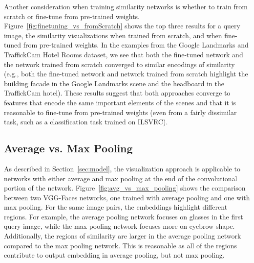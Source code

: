 Another consideration when training similarity networks is whether to train from scratch or fine-tune from pre-trained weights. Figure~\ref{fig:finetuning_vs_fromScratch} shows the top three results for a query image, the similarity visualizations when trained from scratch, and when fine-tuned from pre-trained weights. In the examples from the Google Landmarks and TraffickCam Hotel Rooms dataset, we see that both the fine-tuned network and the network trained from scratch converged to similar encodings of similarity (e.g., both the fine-tuned network and network trained from scratch highlight the building facade in the Google Landmarks scene and the headboard in the TraffickCam hotel). These results suggest
that both approaches converge to features that encode the same important elements of the scenes and that it is reasonable to fine-tune from pre-trained weights (even from a fairly dissimilar task, such as a classification task trained on ILSVRC).

\subsection{Average vs. Max Pooling}

As described in Section~\ref{sec:model}, the visualization approach is applicable to networks with either average and max pooling at the end of the convolutional portion of the network. Figure~\ref{fig:avg_vs_max_pooling} shows the comparison between two VGG-Faces networks, one trained with average pooling and one with max pooling. 
For the same image pairs, the embeddings highlight different regions. For example, 
the average pooling network focuses on glasses in the first query image, while the max pooling network focuses more on eyebrow shape. Additionally, the regions of similarity are larger in the average pooling network compared to the max pooling network. This is reasonable as all of the regions contribute to output embedding in average pooling, but not max pooling. 


